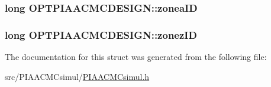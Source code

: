 \hypertarget{structOPTPIAACMCDESIGN_afdfb76344ee9a82f3a5790fcb602ade6}{
\subsubsection[{zonea\+I\+D}]{\setlength{\rightskip}{0pt plus 5cm}long O\+P\+T\+P\+I\+A\+A\+C\+M\+C\+D\+E\+S\+I\+G\+N\+::zonea\+I\+D}}\label{structOPTPIAACMCDESIGN_afdfb76344ee9a82f3a5790fcb602ade6}
\hypertarget{structOPTPIAACMCDESIGN_a46c2ef78ec06d39b947a793d0a03dc28}{
\subsubsection[{zonez\+I\+D}]{\setlength{\rightskip}{0pt plus 5cm}long O\+P\+T\+P\+I\+A\+A\+C\+M\+C\+D\+E\+S\+I\+G\+N\+::zonez\+I\+D}}\label{structOPTPIAACMCDESIGN_a46c2ef78ec06d39b947a793d0a03dc28}


The documentation for this struct was generated from the following file\+:\begin{DoxyCompactItemize}
\item 
src/\+P\+I\+A\+A\+C\+M\+Csimul/\hyperlink{PIAACMCsimul_8h}{P\+I\+A\+A\+C\+M\+Csimul.\+h}\end{DoxyCompactItemize}
